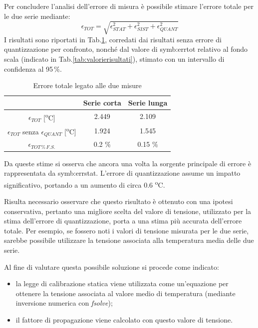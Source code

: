 Per concludere l'analisi dell'errore di misura è possibile stimare l'errore totale per le due serie mediante:
\begin{equation}
	\epsilon_{\textit{TOT}}=\sqrt{\epsilon_{\textit{STAT}}^2+\epsilon_{\textit{SIST}}^2+\epsilon_{\textit{QUANT}}^2}
\end{equation}
I risultati sono riportati in Tab.\ref{tab:risultatitot}, corredati dai risultati senza errore di quantizzazione per confronto, nonché dal valore di \gls{symb:errtot} relativo al fondo scala (indicato in Tab.\ref{tab:valorierisultati}), stimato con un intervallo di confidenza al 95\,\%.
\begin{table}[H]
	\centering
	\begin{tabular}{c|c|c}
		\toprule
		\toprule
		& \textbf{Serie corta} & \textbf{Serie lunga} \\
		\midrule
		$\epsilon_{\textit{TOT}}$ [\textsuperscript{o}C] & 2.449 & 2.109 \\
		\midrule
		$\epsilon_{\textit{TOT}}$ senza $\epsilon_{\textit{QUANT}}$ [\textsuperscript{o}C] & 1.924 & 1.545 \\
		\midrule
		$\epsilon_{\textit{TOT}\, \% \, F.S.}$ & 0.2 \% & 0.15 \% \\
		\bottomrule
		\bottomrule
	\end{tabular}
	\caption{Errore totale legato alle due misure}
	\label{tab:risultatitot}
\end{table}
Da queste stime si osserva che ancora una volta la sorgente principale di errore è rappresentata da \gls{symb:errstat}. L'errore di quantizzazione assume un impatto significativo, portando a un aumento di circa 0.6 \textsuperscript{o}C.

Risulta necessario osservare che questo risultato è ottenuto con una ipotesi conservativa, pertanto una migliore scelta del valore di tensione, utilizzato per la stima dell'errore di quantizzazione, porta a una stima più accurata dell'errore totale. Per esempio, se fossero noti i valori di tensione misurata per le due serie, sarebbe possibile utilizzare la tensione associata alla temperatura media delle due serie.

Al fine di valutare questa possibile soluzione si procede come indicato:
\begin{itemize}
	\item la legge di calibrazione statica viene utilizzata come un'equazione per ottenere la tensione associata al valore medio di temperatura (mediante inversione numerica con \textit{fsolve});
	\item il fattore di propagazione viene calcolato con questo valore di tensione. 
\end{itemize} 

